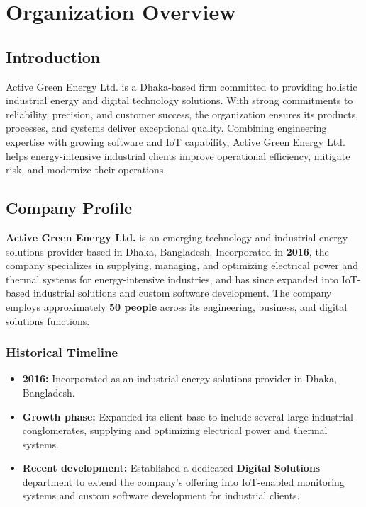 \chapter{Organization Overview}
\label{chapter-2}

\section{Introduction}
\par Active Green Energy Ltd. is a Dhaka-based firm committed to providing holistic industrial energy and digital technology solutions. With strong commitments to reliability, precision, and customer success, the organization ensures its products, processes, and systems deliver exceptional quality. Combining engineering expertise with growing software and IoT capability, Active Green Energy Ltd. helps energy-intensive industrial clients improve operational efficiency, mitigate risk, and modernize their operations.

\section{Company Profile}
\par \textbf{Active Green Energy Ltd.} is an emerging technology and industrial energy solutions provider based in Dhaka, Bangladesh. Incorporated in \textbf{2016}, the company specializes in supplying, managing, and optimizing electrical power and thermal systems for energy-intensive industries, and has since expanded into IoT-based industrial solutions and custom software development. The company employs approximately \textbf{50 people} across its engineering, business, and digital solutions functions.

\subsection{Historical Timeline}
\begin{itemize}
    \item \textbf{2016:} Incorporated as an industrial energy solutions provider in Dhaka, Bangladesh.
    \item \textbf{Growth phase:} Expanded its client base to include several large industrial conglomerates, supplying and optimizing electrical power and thermal systems.
    \item \textbf{Recent development:} Established a dedicated \textbf{Digital Solutions} department to extend the company's offering into IoT-enabled monitoring systems and custom software development for industrial clients.
\end{itemize}

